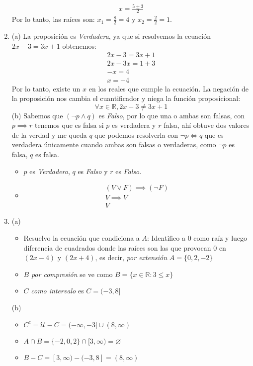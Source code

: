 \documentclass[a4paper]{article}
\begin{document}
\begin{enumerate}
\begin{gather*}
            x=\frac{5\pm 3}{2}
        \end{gather*}
        Por lo tanto, las raíces son: $x_1=\frac{8}{2}=4$ y $x_2=\frac{2}{2}=1$.
        \item (a) La proposición es \textit{Verdadera}, ya que si resolvemos la ecuación $2x-3=3x+1$ obtenemos:
        \begin{gather*}
            2x-3=3x+1\\
            2x-3x=1+3\\
            -x=4\\
            x=-4
        \end{gather*}
        Por lo tanto, existe un $x$ en los reales que cumple la ecuación. La negación de la proposición nos cambia el cuantificador y niega la función proposicional:
        \begin{equation*}
            \forall x \in \mathbb{R}, 2x-3 \neq 3x+1
        \end{equation*}
        (b) Sabemos que $(\neg p \wedge q)$ es \textit{Falso}, por lo que una o ambas son falsas, con $p \implies r$ tenemos que es falsa si $p$ es verdadera y $r$ falsa, ahí obtuve dos valores de la verdad y me queda $q$ que podemos resolverla con $\neg p \iff q$ que es verdadera únicamente cuando ambas son falsas o verdaderas, como $\neg p$ es falsa, $q$ es falsa.
        \begin{itemize}
            \item $p$ es \textit{Verdadero}, $q$ es \textit{Falso} y $r$ es \textit{Falso}.
            \item 
            \begin{gather*}
                    (V \vee F)\implies (\neg F)\\
                    V \implies V\\
                    V
            \end{gather*}
        \end{itemize}
        \item (a)
        \begin{itemize}
            \item Resuelvo la ecuación que condiciona a $A$: Identifico a $0$ como raíz y luego diferencia de cuadrados donde las raíces son las que provocan $0$ en $(2x-4)$ y $(2x+4)$, es decir, \textit{por extensión} $A=\{0,2,-2\}$
            \item $B$ \textit{por compresión} se ve como $B=\{x\in \mathbb{R}: 3\leq x\}$
            \item $C$ \textit{como intervalo} es $C=(-3,8]$
        \end{itemize}
        (b)
        \begin{itemize}
            \item $C^c=\mathcal{U}-C=(-\infty,-3]\cup(8,\infty)$
            \item $A\cap B=\{-2,0,2\} \cap [3,\infty)=\varnothing$
            \item $B-C=[3,\infty)-(-3,8]=(8,\infty)$
        \end{itemize}
    \end{enumerate}
\end{document}
